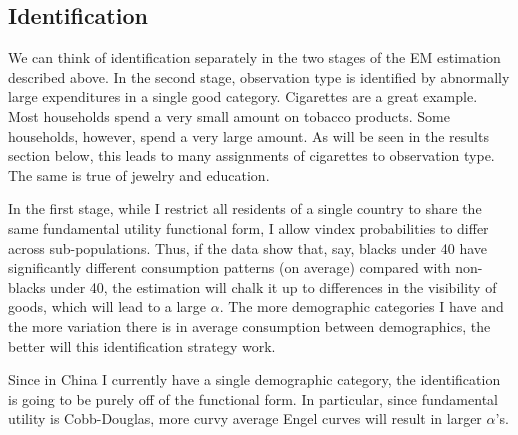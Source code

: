 \documentclass[12pt]{article}
\begin{document}
\subsection{Identification}
We can think of identification separately in the two stages of the EM estimation described above.  In the second stage, observation type is identified by abnormally large expenditures in a single good category.  Cigarettes are a great example.  Most households spend a very small amount on tobacco products.  Some households, however, spend a very large amount.  As will be seen in the results section below, this leads to many assignments of cigarettes to observation type.  The same is true of jewelry and education.

In the first stage, while  I restrict all residents of a single country to share the same fundamental utility functional form, I allow vindex probabilities to differ across sub-populations.  Thus, if the data show that, say, blacks under 40 have significantly different consumption patterns (on average) compared with non-blacks under 40, the estimation will chalk it up to differences in the visibility of goods, which will lead to a large $\alpha$.  The more demographic categories I have and the more variation there is in average consumption between demographics, the better will this identification strategy work. 

Since in China I currently have a single demographic category, the identification is going to be purely off of the functional form.  In particular, since fundamental utility is Cobb-Douglas, more curvy average Engel curves will result in larger $\alpha$'s.
\end{document}
